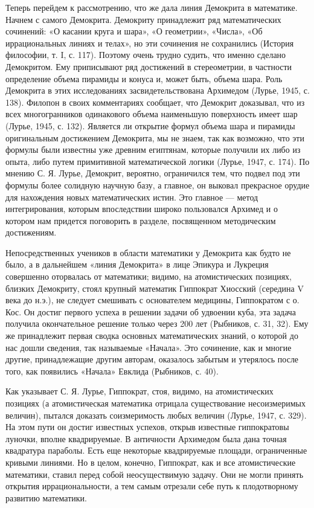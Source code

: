 Теперь  перейдем  к  рассмотрению,  что  же  дала  линия  Демокрита  в
математике.  Начнем  с  самого Демокрита.  Демокриту  принадлежит  ряд
математических  сочинений: «О  касании круга  и шара»,  «О геометрии»,
«Числа»,  «Об иррациональных  линиях  и телах»,  но  эти сочинения  не
сохранились (История  философии, т. I,  с. 117). Поэтому  очень трудно
судить, что именно сделано  Демокритом. Ему приписывают ряд достижений
в  стереометрии,  в частности  определение  объема  пирамиды и  конуса
и,  может  быть, объема  шара.  Роль  Демокрита в  этих  исследованиях
засвидетельствована  Архимедом  (Лурье,  1945,   с.  138).  Филопон  в
своих  комментариях  сообщает, что  Демокрит  доказывал,  что из  всех
многогранников  одинакового объема  наименьшую  поверхность имеет  шар
(Лурье,  1945, с.  132). Является  ли  открытие формул  объема шара  и
пирамиды  оригинальным достижением  Демокрита,  мы не  знаем, так  как
возможно, что эти формулы были известны уже древним египтянам, которые
получили  их  либо из  опыта,  либо  путем примитивной  математической
логики  (Лурье,  1947, с.  174).  По  мнению  С. Я.  Лурье,  Демокрит,
вероятно, ограничился тем,  что подвел под эти  формулы более солидную
научную базу, а  главное, он выковал прекрасное  орудие для нахождения
новых  математических истин.  Это  главное  --- метод  интегрирования,
которым  впоследствии  широко  пользовался  Архимед и  о  котором  нам
придется поговорить в разделе, посвященном методическим достижениям.

Непосредственных учеников  в области математики у  Демокрита как будто
не было,  а в дальнейшем «линия  Демокрита» в лице Эпикура  и Лукреция
совершенно  оторвалась   от  математики;  видимо,   на  атомистических
позициях,  близких   Демокриту,  стоял  крупный   математик  Гиппократ
Хиосский (середина V века до н.э.), не следует смешивать с основателем
медицины, Гиппократом  с о.  Кос. Он достиг  первого успеха  в решении
задачи  об удвоении  куба, эта  задача получила  окончательное решение
только  через  200 лет  (Рыбников,  с.  31,  32). Ему  же  принадлежит
первая сводка основных  математических знаний, о которой  до нас дошли
сведения, так называемые «Начала». Это сочинение, как и многие другие,
принадлежащие  другим авторам,  оказалось  забытым  и утерялось  после
того, как появились «Начала» Евклида (Рыбников, с. 40).

Как указывает С. Я. Лурье,  Гиппократ, стоя, видимо, на атомистических
позициях   (а   атомистическая   математика   отрицала   существование
несоизмеримых величин),  пытался доказать соизмеримость  любых величин
(Лурье,  1947, с.  329). На  этом  пути он  достиг известных  успехов,
открыв   известные  гиппократовы   луночки,  вполне   квадрируемые.  В
античности Архимедом  была дана  точная квадратура параболы.  Есть еще
некоторые  квадрируемые площади,  ограниченные кривыми  линиями. Но  в
целом, конечно, Гиппократ, как и все атомистические математики, ставил
перед  собой  неосуществимую задачу.  Они  не  могли принять  открытия
иррациональности,  а  тем самым  отрезали  себе  путь к  плодотворному
развитию математики.

